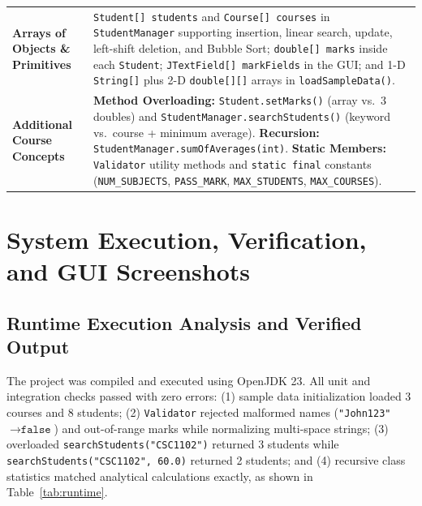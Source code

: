 \documentclass[10pt,a4paper]{article}
\begin{document}
\begin{table}[H]
\begin{tabular}{@{}p{3.4cm} p{14.2cm}@{}}
\addlinespace[1pt]
\textbf{Arrays of Objects \& Primitives} & \texttt{Student[] students} and \texttt{Course[] courses} in \texttt{StudentManager} supporting insertion, linear search, update, left-shift deletion, and Bubble Sort; \texttt{double[] marks} inside each \texttt{Student}; \texttt{JTextField[] markFields} in the GUI; and 1-D \texttt{String[]} plus 2-D \texttt{double[][]} arrays in \texttt{loadSampleData()}. \\
\addlinespace[1pt]
\textbf{Additional Course Concepts} & \textbf{Method Overloading:} \texttt{Student.setMarks()} (array vs.\ 3 doubles) and \texttt{StudentManager.searchStudents()} (keyword vs.\ course + minimum average). \textbf{Recursion:} \texttt{StudentManager.sumOfAverages(int)}. \textbf{Static Members:} \texttt{Validator} utility methods and \texttt{static final} constants (\texttt{NUM\_SUBJECTS}, \texttt{PASS\_MARK}, \texttt{MAX\_STUDENTS}, \texttt{MAX\_COURSES}). \\
\bottomrule
\end{tabular}
\end{table}

\section{System Execution, Verification, and GUI Screenshots}

\subsection{Runtime Execution Analysis and Verified Output}
The project was compiled and executed using OpenJDK 23. All unit and integration checks passed with zero errors: (1) sample data initialization loaded 3 courses and 8 students; (2) \texttt{Validator} rejected malformed names (\texttt{"John123"} $\rightarrow \texttt{false}$) and out-of-range marks while normalizing multi-space strings; (3) overloaded \texttt{searchStudents("CSC1102")} returned 3 students while \texttt{searchStudents("CSC1102", 60.0)} returned 2 students; and (4) recursive class statistics matched analytical calculations exactly, as shown in Table~\ref{tab:runtime}.
\end{document}
